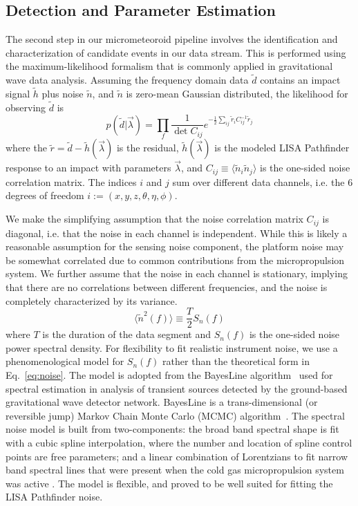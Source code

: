 \documentclass[twocolumn, trackchanges]{aastex62}
\newcommand{\data}{\tilde d}
\newcommand{\model}{\tilde h}
\newcommand{\residual}{\tilde r}
\newcommand{\params}{{\vec \lambda}}
\newcommand{\n}{\tilde n}
\newcommand{\Cij}{C_{ij}}
\newcommand{\invCij}{C_{ij}^{-1}}
\begin{document}
\subsection{Detection and Parameter Estimation}\label{sec:MCMC}
The second step in our micrometeoroid pipeline involves the identification and characterization of candidate events in our data stream.  This is performed using the maximum-likelihood formalism that is commonly applied in gravitational wave data analysis. 
Assuming the frequency domain data $\data$ contains an impact signal $\model$ plus noise $\n$, and $\n$ is zero-mean Gaussian distributed, the likelihood for observing  $\data$ is
\begin{equation}
p(\data|\params) = \prod_f \frac{1}{\det \Cij} e^{-\frac{1}{2}\sum_{ij} \residual_i \invCij \residual_j }
\label{eq:likelihood}
\end{equation}
where the $\residual = \data - \model(\params)$ is the residual, $\model(\params)$ is the modeled LISA Pathfinder response to an impact with parameters $\params$, and  $\Cij \equiv \langle \n_i \n_j\rangle$ is the one-sided noise correlation matrix. The indices $i$ and $j$ sum over different data channels, i.e. the 6 degrees of freedom $i:=(x,y,z,\theta,\eta,\phi)$.

We make the simplifying assumption that the noise correlation matrix $\Cij$ is diagonal, i.e. that the noise in each channel is independent. While this is likely a reasonable assumption for the sensing noise component, the platform noise may be somewhat correlated due to common contributions from the micropropulsion system. 
We further assume that the noise in each channel is stationary, implying that there are no  correlations between different frequencies, and the noise is completely characterized by its variance.
\begin{equation}
\langle \n^2(f)\rangle \equiv \frac{T}{2}S_n(f)
\end{equation}
where $T$ is the duration of the data segment and $S_n(f)$ is the one-sided noise power spectral density.
For flexibility to fit realistic instrument noise, we use a phenomenological model for $S_n(f)$ rather than the theoretical form in Eq.~\ref{eq:noise}.
The model is adopted from the BayesLine algorithm~\citep{Littenberg_15} used for spectral estimation in analysis of transient sources detected by the ground-based gravitational wave detector network.
BayesLine is a trans-dimensional (or reversible jump) Markov Chain Monte Carlo (MCMC) algorithm~\citep{Green_95}.
The spectral noise model is built from two-components:  the broad band spectral shape is fit with a cubic spline interpolation, where the number and location of spline control points are free parameters; and a linear combination of  Lorentzians to fit narrow band spectral lines that were present when the cold gas micropropulsion system was active \citep{ST7_Results}.
The model is flexible, and proved to be well suited for fitting the LISA Pathfinder noise.
\end{document}
